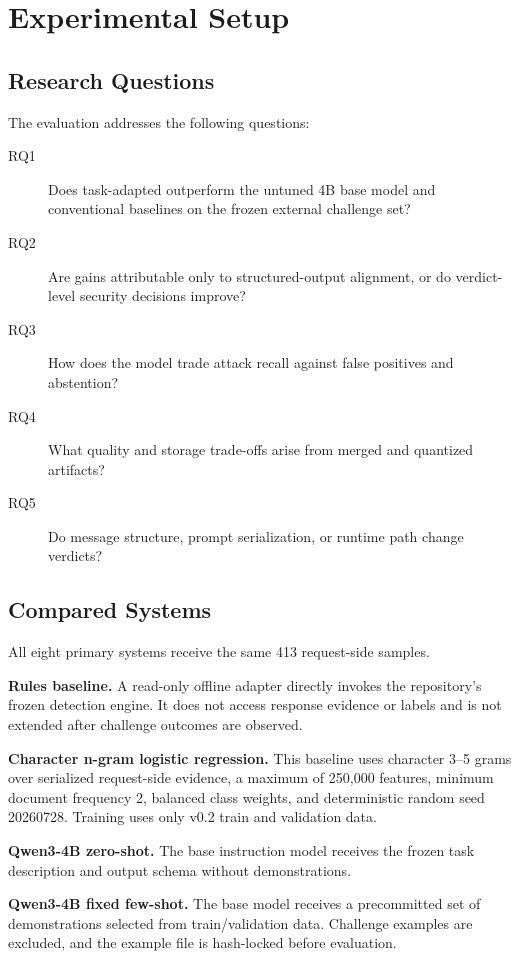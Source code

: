 \section{Experimental Setup}
\label{sec:setup}

\subsection{Research Questions}
The evaluation addresses the following questions:
\begin{description}
    \item[RQ1] Does task-adapted \model{} outperform the untuned 4B base model and conventional baselines on the frozen external challenge set?
    \item[RQ2] Are gains attributable only to structured-output alignment, or do verdict-level security decisions improve?
    \item[RQ3] How does the model trade attack recall against false positives and abstention?
    \item[RQ4] What quality and storage trade-offs arise from merged and quantized artifacts?
    \item[RQ5] Do message structure, prompt serialization, or runtime path change verdicts?
\end{description}

\subsection{Compared Systems}
All eight primary systems receive the same 413 request-side samples.

\textbf{Rules baseline.} A read-only offline adapter directly invokes the repository's frozen detection engine. It does not access response evidence or labels and is not extended after challenge outcomes are observed.

\textbf{Character n-gram logistic regression.} This baseline uses character 3--5 grams over serialized request-side evidence, a maximum of 250,000 features, minimum document frequency 2, balanced class weights, and deterministic random seed 20260728. Training uses only v0.2 train and validation data.

\textbf{Qwen3-4B zero-shot.} The base instruction model receives the frozen task description and output schema without demonstrations.

\textbf{Qwen3-4B fixed few-shot.} The base model receives a precommitted set of demonstrations selected from train/validation data. Challenge examples are excluded, and the example file is hash-locked before evaluation.


